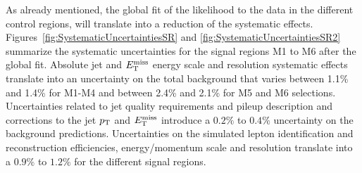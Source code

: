 As already mentioned, the global fit of the likelihood to the data in the different control regions, will translate into a reduction of the systematic effects.
Figures~\ref{fig:SystematicUncertaintiesSR} and \ref{fig:SystematicUncertaintiesSR2} summarize the systematic uncertainties for the signal regions M1 to M6 after the global fit.
Absolute jet and $E_{\mathrm{T}}^{\mathrm{miss}}$ energy scale and resolution systematic effects translate into an uncertainty on the total background that varies between 1.1\% and 1.4\% for M1-M4 and between 2.4\% and 2.1\% for M5 and M6 selections.
Uncertainties related to jet quality requirements and pileup description and corrections to the jet $p_{\mathrm{T}}$ and $E_{\mathrm{T}}^{\mathrm{miss}}$ introduce a $0.2\%$ to $0.4\%$ uncertainty on the background predictions.
Uncertainties on the simulated lepton identification and reconstruction efficiencies, energy/momentum scale and resolution translate into a $0.9\%$ to $1.2\%$ for the different signal regions.

